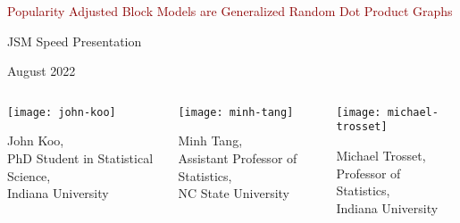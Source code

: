 \documentclass[
  ignorenonframetext,
]{beamer}
\author[John Koo]{John Koo}
\author{}
\date{\vspace{-2.5em}}
\begin{document}
\begin{frame}[plain]{}
\protect\hypertarget{section}{}
\center

\LARGE

\textcolor{darkred}{Popularity Adjusted Block Models are Generalized Random Dot Product Graphs}

\normalsize

JSM Speed Presentation

August 2022

\begin{columns}[T]
\begin{column}{0.33\textwidth}
\begin{center}\texttt{[image: john-koo]} \end{center}

John Koo,\\
PhD Student in Statistical Science,\\
Indiana University
\end{column}

\begin{column}{0.33\textwidth}
\begin{center}\texttt{[image: minh-tang]} \end{center}

Minh Tang,\\
Assistant Professor of Statistics,\\
NC State University
\end{column}

\begin{column}{0.33\textwidth}
\begin{center}\texttt{[image: michael-trosset]} \end{center}

Michael Trosset,\\
Professor of Statistics,\\
Indiana University
\end{column}
\end{columns}
\end{frame}
\end{document}
